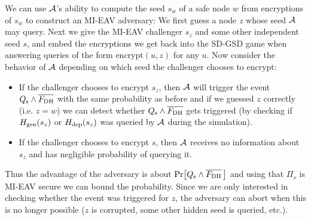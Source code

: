 We can use $\mathcal{A}$'s ability to compute the seed $s_w$ of a safe node $w$ from encryptions of $s_w$ to construct an MI-EAV adversary: We first guess a node $z$ whose seed $\mathcal{A}$ may query. Next we give the MI-EAV challenger $s_z$ and some other independent seed $s$, and embed the encryptions we get back into the SD-GSD game when answering queries of the form $\mathrm{encrypt}(u, z)$ for any $u$. Now consider the behavior of $\mathcal{A}$ depending on which seed the challenger chooses to encrypt:
\begin{itemize}
	\item If the challenger chooses to encrypt $s_z$, then $\mathcal{A}$ will trigger the event $Q_\mathrm{s} \land \overline{F_\mathrm{DH}}$ with the same probability as before and if we guessed $z$ correctly (i.e. $z = w$) we can detect whether $Q_\mathrm{s} \land \overline{F_\mathrm{DH}}$ gets triggered (by checking if $H_\mathrm{gen}(s_z)$ or $H_\mathrm{dep}(s_z)$ was queried by $\mathcal{A}$ during the simulation).
	\item If the challenger chooses to encrypt $s$, then $\mathcal{A}$ receives no information about $s_z$ and has negligible probability of querying it.
\end{itemize}
Thus the advantage of the adversary is about $\pr{\qs \land \overline{\fdh}\,}$ and using that $\Pi_s$ is MI-EAV secure we can bound the probability. Since we are only interested in checking whether the event was triggered for $z$, the adversary can abort when this is no longer possible ($z$ is corrupted, some other hidden seed is queried, etc.).

